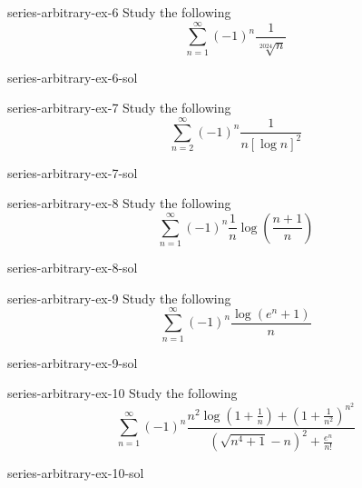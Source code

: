 \documentclass[preview]{standalone}
\begin{document}
\begin{snippetexercise}{series-arbitrary-ex-6}{}
    Study the following \series
    \[
        \sum_{n=1}^\infty {(-1)}^n \frac{1}{\sqrt[2024]{n}}
    \]
\end{snippetexercise}

\begin{snippetsolution}{series-arbitrary-ex-6-sol}{}
    \todo
\end{snippetsolution}

\begin{snippetexercise}{series-arbitrary-ex-7}{}
    Study the following \series
    \[
        \sum_{n=2}^\infty {(-1)}^n \frac{1}{n {\left[\log n\right]}^2}
    \]
\end{snippetexercise}

\begin{snippetsolution}{series-arbitrary-ex-7-sol}{}
    \todo
\end{snippetsolution}

\begin{snippetexercise}{series-arbitrary-ex-8}{}
    Study the following \series
    \[
        \sum_{n=1}^\infty {(-1)}^n \frac{1}{n}
        \log\left(\frac{n+1}{n}\right)
    \]
\end{snippetexercise}

\begin{snippetsolution}{series-arbitrary-ex-8-sol}{}
    \todo
\end{snippetsolution}

\begin{snippetexercise}{series-arbitrary-ex-9}{}
    Study the following \series
    \[
        \sum_{n=1}^\infty {(-1)}^n
        \frac{\log(e^n + 1)}{n}
    \]
\end{snippetexercise}

\begin{snippetsolution}{series-arbitrary-ex-9-sol}{}
    \todo
\end{snippetsolution}

\begin{snippetexercise}{series-arbitrary-ex-10}{}
    Study the following \series
    \[
        \sum_{n=1}^\infty {(-1)}^n
        \frac{
            n^2\log\left(1 + \frac{1}{n}\right)
            + {\left(1 + \frac{1}{n^2}\right)}^{n^2}
        }{
            {(\sqrt{n^4+1}-n)}^2 + \frac{e^n}{n!}
        }
    \]
\end{snippetexercise}

\begin{snippetsolution}{series-arbitrary-ex-10-sol}{}
    \todo
\end{snippetsolution}
\end{document}
